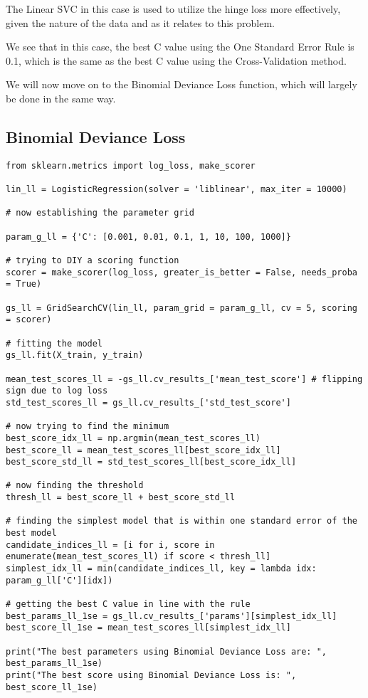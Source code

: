 \documentclass[12pt, letterpaper]{article}
\begin{document}
The Linear SVC in this case is used to utilize the hinge loss more effectively, given the nature of the data and as it relates to this problem. 

We see that in this case, the best C value using the One Standard Error Rule is 0.1, which is the same as the best C value using the Cross-Validation method. 

We will now move on to the Binomial Deviance Loss function, which will largely be done in the same way. 

\subsection{Binomial Deviance Loss} 

\begin{verbatim} 
from sklearn.metrics import log_loss, make_scorer 

lin_ll = LogisticRegression(solver = 'liblinear', max_iter = 10000) 

# now establishing the parameter grid 

param_g_ll = {'C': [0.001, 0.01, 0.1, 1, 10, 100, 1000]} 

# trying to DIY a scoring function 
scorer = make_scorer(log_loss, greater_is_better = False, needs_proba = True)
 
gs_ll = GridSearchCV(lin_ll, param_grid = param_g_ll, cv = 5, scoring = scorer) 

# fitting the model 
gs_ll.fit(X_train, y_train) 

mean_test_scores_ll = -gs_ll.cv_results_['mean_test_score'] # flipping sign due to log loss 
std_test_scores_ll = gs_ll.cv_results_['std_test_score']

# now trying to find the minimum 
best_score_idx_ll = np.argmin(mean_test_scores_ll) 
best_score_ll = mean_test_scores_ll[best_score_idx_ll]
best_score_std_ll = std_test_scores_ll[best_score_idx_ll]

# now finding the threshold 
thresh_ll = best_score_ll + best_score_std_ll 

# finding the simplest model that is within one standard error of the best model 
candidate_indices_ll = [i for i, score in enumerate(mean_test_scores_ll) if score < thresh_ll]
simplest_idx_ll = min(candidate_indices_ll, key = lambda idx: param_g_ll['C'][idx])

# getting the best C value in line with the rule 
best_params_ll_1se = gs_ll.cv_results_['params'][simplest_idx_ll]
best_score_ll_1se = mean_test_scores_ll[simplest_idx_ll]

print("The best parameters using Binomial Deviance Loss are: ", best_params_ll_1se) 
print("The best score using Binomial Deviance Loss is: ", best_score_ll_1se) 
\end{verbatim} 
\end{document}
